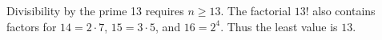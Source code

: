 Divisibility by the prime 13 requires $n\ge13$. The factorial $13!$ also contains factors for $14=2\cdot7$, $15=3\cdot5$, and $16=2^4$. Thus the least value is $\boxed{13}$.

